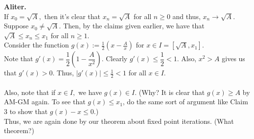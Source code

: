 \documentclass{article}
\begin{document}
\begin{enumerate}
	\textbf{Aliter.} \\
	If $x_0 = \sqrt{A},$ then it's clear that $x_n = \sqrt{A}$ for all $n \ge 0$ and thus, $x_n \to \sqrt{A}.$\\
	Suppose $x_0 \neq \sqrt{A}.$ Then, by the claims given earlier, we have that $\sqrt{A} \le x_n \le x_1$ for all $n \ge 1.$\\
	Consider the function $g(x) := \frac{1}{2}\left(x - \frac{A}{x}\right)$ for $x \in I = [\sqrt{A}, x_1].$\\
	Note that $g'(x) = \dfrac{1}{2}\left(1 - \dfrac{A}{x^2}\right).$ Clearly $g'(x) \le \dfrac{1}{2} < 1.$ Also, $x^2 > A$ gives us that $g'(x) > 0.$ Thus, $|g'(x)| \le \frac{1}{2} < 1$ for all $x \in I.$\\\\
	Also, note that if $x \in I,$ we have $g(x) \in I.$ (Why? It is clear that $g(x) \ge A$ by AM-GM again. To see that $g(x) \le x_1$, do the same sort of argument like Claim 3 to show that $g(x) - x \le 0$.)\\
	Thus, we are again done by our theorem about fixed point iterations. \hfill (What theorem?)
\end{enumerate}
\end{document}
